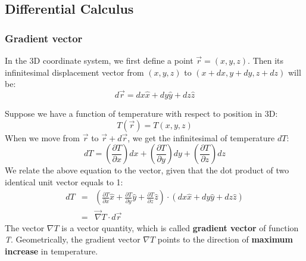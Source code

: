 \documentclass[12pt,a4paper,twoside]{article}
\numberwithin{equation}{section}
\begin{document}
	\subsection{Differential Calculus}
	\subsubsection{Gradient vector}
	In the 3D coordinate system, we first define a point \(\overrightarrow{r}=(x,y,z)\). Then its infinitesimal displacement vector from \((x,y,z)\) to \((x+dx, y+dy, z+dz)\) will be:
	\begin{equation}
		d\overrightarrow{r}=dx\hat{x}+dy\hat{y}+dz\hat{z}
	\end{equation}
	
	\noindent Suppose we have a function of temperature with respect to position in 3D:
	\[T(\overrightarrow{r})=T(x,y,z)\]
	When we move from \(\overrightarrow{r}\) to \(\overrightarrow{r}+d\overrightarrow{r}\), we get the infinitesimal of temperature \(dT\):
	\[dT=(\frac{\partial T}{\partial x})dx+(\frac{\partial T}{\partial y})dy+(\frac{\partial T}{\partial z})dz\]
	We relate the above equation to the vector, given that the dot product of two identical unit vector equals to 1:
	\begin{eqnarray*}
		dT &=& \left(\frac{\partial T}{\partial x}\hat x+\frac{\partial T}{\partial y}\hat y+\frac{\partial T}{\partial z}\hat z\right)\cdot (dx\hat x+ dy\hat y+dz\hat z)\\
		&=& \overrightarrow{\nabla} T \cdot d\overrightarrow{r}
	\end{eqnarray*}
	The vector \(\nabla T\) is a vector quantity, which is called \textbf{gradient vector} of function \textit{T}. Geometrically, the gradient vector \(\nabla T\) points to the direction of \textbf{maximum increase} in temperature.\\
	
\end{document}

